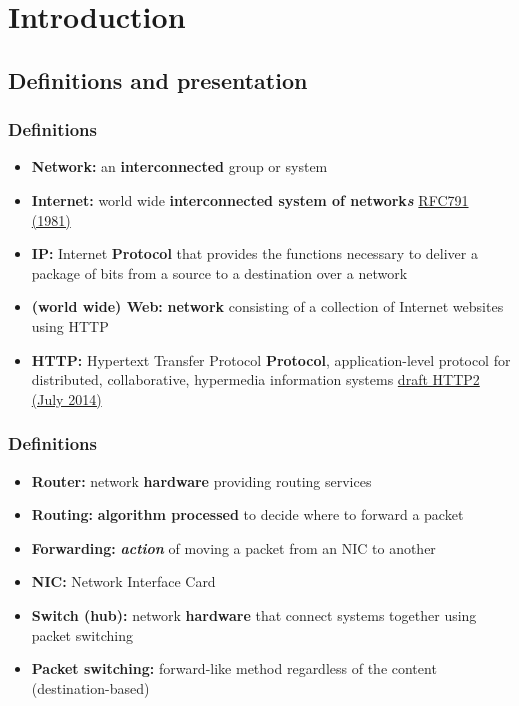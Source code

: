 \section{Introduction}
\subsection{Definitions and presentation}
  \begin{frame}
    \frametitle{Definitions}
      \begin{itemize}
        \item \textbf{Network:} an \textbf{interconnected} group or system\pause
        \item \textbf{Internet:} world wide \textbf{interconnected system of network\emph{s}} \color{blue}\href{http://tools.ietf.org/html/rfc791}{RFC791 (1981)}\color{black}\pause
        \item \textbf{IP:} Internet \textbf{Protocol} that provides the functions necessary to deliver a package of bits from a source to a destination over a network\pause
        \item \textbf{(world wide) Web:} \textbf{network} consisting of a collection of Internet websites using HTTP\pause
        \item \textbf{HTTP:} Hypertext Transfer Protocol \textbf{Protocol}, application-level protocol for distributed, collaborative, hypermedia information systems \color{blue}\href{http://tools.ietf.org/html/draft-ietf-httpbis-http2-14}{draft HTTP2 (July 2014)} \color{black}
      \end{itemize}
  \end{frame}
  \begin{frame}
    \frametitle{Definitions}
      \begin{itemize}
        \item \textbf{Router:} network \textbf{hardware} providing routing services\pause
        \item \textbf{Routing:} \textbf{algorithm processed} to decide where to forward a packet\pause
        \item \textbf{Forwarding:} \textbf{\emph{action}} of moving a packet from an NIC to another\pause
        \item \textbf{NIC:} Network Interface Card
        \item \textbf{Switch (hub):} network \textbf{hardware} that connect systems together using packet switching\pause
        \item \textbf{Packet switching:} forward-like method regardless of the content (destination-based)\pause
      \end{itemize}
  \end{frame}
